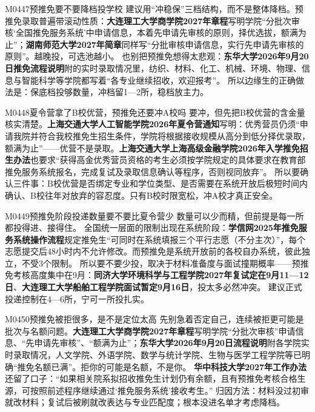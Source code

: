 \begin{qa}{M0447}{预推免要不要降档投学校}
建议用“冲稳保”三档结构，而不是整体降档。预推免录取普遍带滚动性质：\textbf{大连理工大学商学院2027年章程}写明学院“分批次审核‘全国推免服务系统’中申请信息，本着先申请先审核的原则，择优选拔，额满为止”；\textbf{湖南师范大学2027年简章}同样写“分批审核申请信息，实行先申请先审核的原则”。越晚投，可选池越小。
也别把预推免想得太悲观：\textbf{东华大学2026年9月20日推免流程说明}附的实时录取情况里，纺织、材料、化工、机械、环境、物理、信息与智能科学等学院都写着“各专业继续招收，欢迎报考”。
所以边缘生的正确做法是：保底档投够数量，冲档留1—2所，稳档放主力。
\end{qa}

\begin{qa}{M0448}{夏令营拿了B校优营，预推免还要冲A校吗}
要冲，但先把B校优营的含金量核实清楚。\textbf{上海交通大学人工智能学院2026年夏令营通知}写明：优秀营员仍须“申请我院并符合我校推免生招生条件，学院将根据接收规模从高分到低分择优录取，额满为止”——优营不是录取。\textbf{上海交通大学上海高级金融学院2026年入学推免招生办法}也要求“获得高金优秀营员资格的考生必须按学院规定的具体要求在教育部推免服务系统报名，完成复试及录取信息确认等程序，否则视同放弃”。
所以要确认三件事：B校优营是否绑定专业和学位类型、是否需要在系统开放后极短时间内确认、B校往年对放弃的容忍度。只有B校时限宽松，冲A校才真正安全。
\end{qa}

\begin{qa}{M0449}{预推免阶段投递数量要不要比夏令营少}
数量可以少而精，但前提是每一所都投得进、接得住。
全国统一层面的限制出现在系统阶段：\textbf{学信网2025年推免服务系统操作流程}规定推免生“可同时在系统填报三个平行志愿（不分主次）”，每个志愿提交后48小时内不允许修改。而预推免是系统开放前的各校自办系统，彼此独立，不受3个限制。
所以要不要少投，取决于材料准备度与面试撞期概率——预推免考核高度集中在9月：\textbf{同济大学环境科学与工程学院2027年复试定在9月11—12日}、\textbf{大连理工大学船舶工程学院面试暂定9月16日}，投太多必然冲突。
建议正式投递控制在4—6所，宁可一所投扎实。
\end{qa}

\begin{qa}{M0450}{预推免被拒很多，是不是定位太高}
先别急着否定自己，连续被拒更可能是批次与名额问题。\textbf{大连理工大学商学院2027年章程}写明学院“分批次审核”申请信息、“先申请先审核”、“额满为止”；\textbf{东华大学2026年9月20日流程说明}附各学院实时录取情况，人文学院、外语学院、数学与统计学院、生物与医学工程学院等已明确“推免名额已满”。拒你的可能是名额，不是你。
\textbf{华中科技大学2027年工作办法}还留了口子：“如果相关院系拟招收推免生计划仍有余额，且有预推免考核合格生源，可按照前述程序继续通过‘推免服务系统’接收考生。”
归因方法：材料没过初审就改材料；复试后被刷就改表达与专业匹配度；根本没进名单才考虑降档。
\end{qa}

